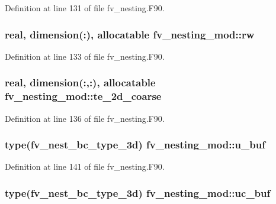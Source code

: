 Definition at line 131 of file fv\-\_\-nesting.\-F90.

\subsubsection[{rw}]{\setlength{\rightskip}{0pt plus 5cm}real, dimension(\-:), allocatable fv\-\_\-nesting\-\_\-mod\-::rw}\label{classfv__nesting__mod_a762ae685097064afedcd7fdb8724453a}


Definition at line 133 of file fv\-\_\-nesting.\-F90.

\subsubsection[{te\-\_\-2d\-\_\-coarse}]{\setlength{\rightskip}{0pt plus 5cm}real, dimension(\-:,\-:), allocatable fv\-\_\-nesting\-\_\-mod\-::te\-\_\-2d\-\_\-coarse}\label{classfv__nesting__mod_adbed3c960cd1c9a05ea941ec468224a3}


Definition at line 136 of file fv\-\_\-nesting.\-F90.

\subsubsection[{u\-\_\-buf}]{\setlength{\rightskip}{0pt plus 5cm}type(fv\-\_\-nest\-\_\-bc\-\_\-type\-\_\-3d) fv\-\_\-nesting\-\_\-mod\-::u\-\_\-buf}\label{classfv__nesting__mod_a23ef282a2b544e33d2a2f480173fa7cc}


Definition at line 141 of file fv\-\_\-nesting.\-F90.

\subsubsection[{uc\-\_\-buf}]{\setlength{\rightskip}{0pt plus 5cm}type(fv\-\_\-nest\-\_\-bc\-\_\-type\-\_\-3d) fv\-\_\-nesting\-\_\-mod\-::uc\-\_\-buf}\label{classfv__nesting__mod_af94489e73fc64a474de665ee71a17334}


